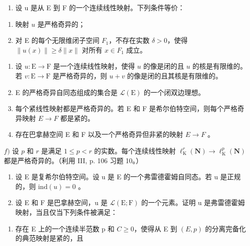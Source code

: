 \begin{enumerate}
\def\labelenumi{\alph{enumi})}
\tightlist
\item
  设 u 是从 E 到 F 的一个连续线性映射。下列条件等价：
\end{enumerate}

\begin{enumerate}
\def\labelenumi{(\roman{enumi})}
\item
  映射 \(u\) 是严格奇异的；
\item
  对 E 的每个无限维闭子空间 \(F_{1}\)，不存在实数 \(\delta > 0\)，使得 \(\|u(x)\| \geqslant \delta\|x\|\) 对所有 \(x \in F_{1}\) 成立。
\end{enumerate}

\begin{enumerate}
\def\labelenumi{\alph{enumi})}
\setcounter{enumi}{1}
\item
  设 \(u \colon \mathrm{E} \to \mathrm{F}\) 是一个连续线性映射，使得 \(u\) 的像是闭的且 \(u\) 的核是有限维的。若 \(v \colon \mathrm{E} \to \mathrm{F}\) 是严格奇异的，则 \(u + v\) 的像是闭的且其核是有限维的。
\item
  E 的严格奇异自同态组成的集合是 \(\mathcal{L}(\mathrm{E})\) 的一个闭双边理想。
\item
  每个紧线性映射都是严格奇异的。若 E 和 F 是希尔伯特空间，则每个严格奇异映射 \(E \rightarrow F\) 都是紧的。
\item
  存在巴拿赫空间 E 和 F 以及一个严格奇异但非紧的映射 \(E \rightarrow F\) 。
\end{enumerate}

\(f)\) 设 \(p\) 和 \(r\) 是满足 \(1 \leqslant p < r\) 的实数。每个连续线性映射 \(\ell_{\mathrm{K}}^{r}(\mathbf{N}) \to \ell_{\mathrm{K}}^{p}(\mathbf{N})\) 都是严格奇异的。（利用 III, p. 106 习题 10。）

\begin{enumerate}
\def\labelenumi{\arabic{enumi})}
\setcounter{enumi}{5}
\item
  设 E 是复希尔伯特空间。设 u 是 E 的一个弗雷德霍姆自同态。若 u 是正规的，则 \(\text{ind}(u) = 0\) 。
\item
  设 E 和 F 是巴拿赫空间，u 是 \(\mathcal{L}(\mathrm{E};\mathrm{F})\) 的一个元素。证明 u 是弗雷德霍姆映射，当且仅当下列条件被满足：
\end{enumerate}

\begin{enumerate}
\def\labelenumi{(\roman{enumi})}
\tightlist
\item
  存在 E 上的一个连续半范数 p 和 \(C \geqslant 0\)，使得从 E 到 \((E, p)\) 的分离完备化的典范映射是紧的，且
\end{enumerate}


